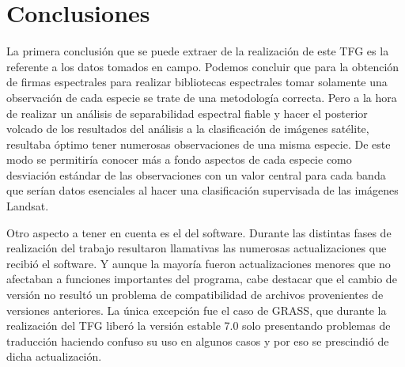


\chapter{Conclusiones}

La primera conclusión que se puede extraer de la realización de este \ac{TFG} es la referente a los datos tomados en campo. Podemos concluir que para la obtención de firmas espectrales para realizar bibliotecas espectrales tomar solamente una observación de cada especie se trate de una metodología correcta. Pero a la hora de realizar un análisis de separabilidad espectral fiable y hacer el posterior volcado de los resultados del análisis a la clasificación de imágenes satélite, resultaba óptimo tener numerosas observaciones de una misma especie. De este modo se permitiría conocer más a fondo aspectos de cada especie como desviación estándar de las observaciones con un valor central para cada banda que serían datos esenciales al hacer una clasificación supervisada de las imágenes Landsat.\Sep

Otro aspecto a tener en cuenta es el del software. Durante las distintas fases de realización del trabajo resultaron llamativas las numerosas actualizaciones que recibió el software. Y aunque la mayoría fueron actualizaciones menores que no afectaban a funciones importantes del programa, cabe destacar que el cambio de versión no resultó un problema de compatibilidad de archivos provenientes de versiones anteriores. La única excepción fue el caso de GRASS, que durante la realización del \ac{TFG} liberó la versión estable 7.0 solo presentando problemas de traducción haciendo confuso su uso en algunos casos y por eso se prescindió de dicha actualización.\Sep
